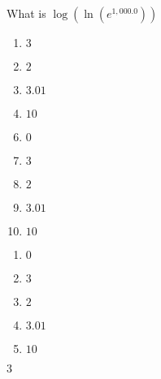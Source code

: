 

 What is $\log(\ln(e^{1,000.0}))$


\ifsat
	\begin{enumerate}[label=\Alph*)]
		\item   $3$%
		\item  $2$
		\item $3.01$
		\item  $10$
	\end{enumerate}
\else
\fi

\ifacteven
	\begin{enumerate}[label=\textbf{\Alph*.},itemsep=\fill,align=left]
		\setcounter{enumii}{5}
		\item    $0$
		\item   $3$%
		\item  $2$
		\addtocounter{enumii}{1}
		\item $3.01$
		\item  $10$
	\end{enumerate}
\else
\fi

\ifactodd
	\begin{enumerate}[label=\textbf{\Alph*.},itemsep=\fill,align=left]
		\item    $0$
		\item   $3$%
		\item  $2$
		\item $3.01$
		\item  $10$
	\end{enumerate}
\else
\fi

\ifgridin
   $3$%
		
\else
\fi

